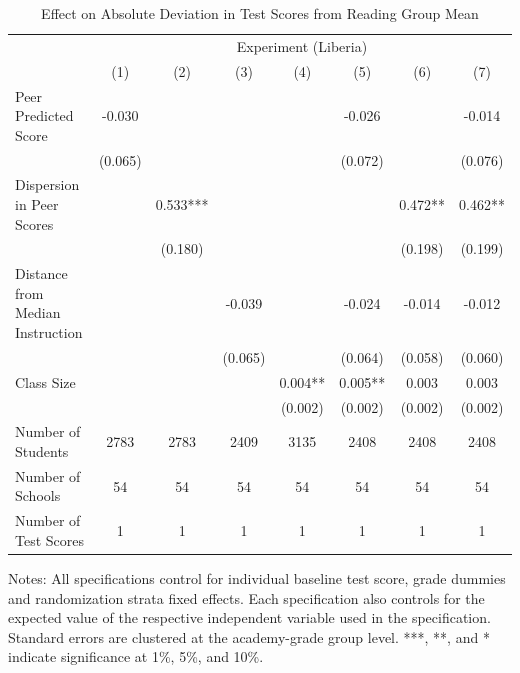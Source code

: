 \begin{table}[!h]
\centering\centering\centering
\caption{Effect on Absolute Deviation in Test Scores from Reading Group Mean}
\centering
\begin{threeparttable}
\fontsize{10}{12}\selectfont
\begin{tabular}[t]{lccccccc}
\toprule
\multicolumn{1}{c}{ } & \multicolumn{7}{c}{Experiment (Liberia)} \\
\cmidrule(l{3pt}r{3pt}){2-8}
  & (1) & (2) & (3) & (4) & (5) & (6) & (7)\\
\midrule
Peer Predicted Score & -0.030 &  &  &  & -0.026 &  & -0.014\\
 & (0.065) &  &  &  & (0.072) &  & (0.076)\\
Dispersion in Peer Scores &  & 0.533*** &  &  &  & 0.472** & 0.462**\\
 &  & (0.180) &  &  &  & (0.198) & (0.199)\\
Distance from Median Instruction &  &  & -0.039 &  & -0.024 & -0.014 & -0.012\\
 &  &  & (0.065) &  & (0.064) & (0.058) & (0.060)\\
Class Size &  &  &  & 0.004** & 0.005** & 0.003 & 0.003\\
 &  &  &  & (0.002) & (0.002) & (0.002) & (0.002)\\
\hline
\midrule
Number of Students & 2783 & 2783 & 2409 & 3135 & 2408 & 2408 & 2408\\
Number of Schools & 54 & 54 & 54 & 54 & 54 & 54 & 54\\
Number of Test Scores & 1 & 1 & 1 & 1 & 1 & 1 & 1\\
\bottomrule
\end{tabular}
\begin{tablenotes}[para]
\item Notes: All specifications control for individual baseline test score,
                      grade dummies and randomization strata fixed effects. Each specification
                      also controls for the expected value of the respective independent variable
                      used in the specification. Standard errors are clustered at the academy-grade group                        level. ***, **, and * indicate significance at 1\%, 5\%, and 10\%.
\end{tablenotes}
\end{threeparttable}
\end{table}
